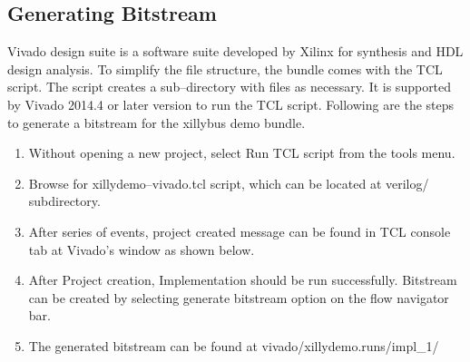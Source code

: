 \subsection{Generating Bitstream}
Vivado design suite is a software suite developed by Xilinx for synthesis and HDL design analysis. To simplify the file structure, the bundle comes with the TCL script. The script creates a sub--directory with files as necessary. It is supported by Vivado 2014.4 or later version to run the TCL script. Following are the steps to generate a bitstream for the xillybus demo bundle.
\begin{enumerate}\itemsep0em 
\item Without opening a new project, select Run TCL script from the tools menu.
\item Browse for xillydemo--vivado.tcl script, which can be located at verilog/ subdirectory.
\item After series of events, project created message can be found in TCL console tab at Vivado's window as shown below.
	
\item After Project creation, Implementation should be run successfully. Bitstream can be created by selecting generate bitstream option on the flow navigator bar.
\item	The generated bitstream can be found at vivado/xillydemo.runs/impl\_1/
\end{enumerate}

